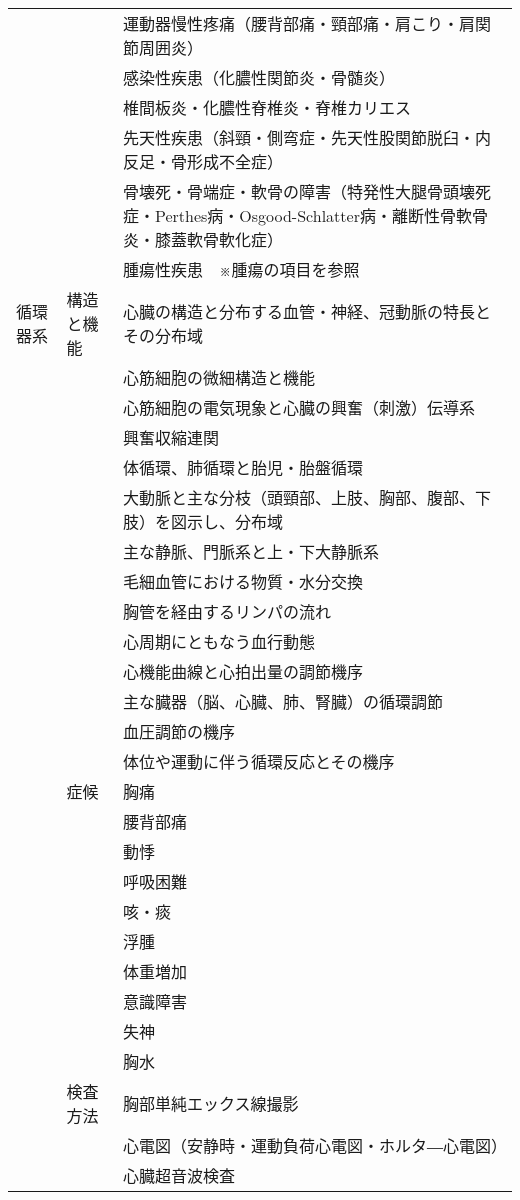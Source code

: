 \documentclass[
]{ltjsarticle}
\begin{document}
\begin{xltabular}{\linewidth}{XXX}
 &  & 運動器慢性疼痛（腰背部痛・頸部痛・肩こり・肩関節周囲炎） \\
 &  & 感染性疾患（化膿性関節炎・骨髄炎） \\
 &  & 椎間板炎・化膿性脊椎炎・脊椎カリエス \\
 &  & 先天性疾患（斜頸・側弯症・先天性股関節脱臼・内反足・骨形成不全症） \\
 &  & 骨壊死・骨端症・軟骨の障害（特発性大腿骨頭壊死症・Perthes病・Osgood-Schlatter病・離断性骨軟骨炎・膝蓋軟骨軟化症） \\
 &  & 腫瘍性疾患　※腫瘍の項目を参照 \\
循環器系 & 構造と機能 & 心臓の構造と分布する血管・神経、冠動脈の特長とその分布域 \\
 &  & 心筋細胞の微細構造と機能 \\
 &  & 心筋細胞の電気現象と心臓の興奮（刺激）伝導系 \\
 &  & 興奮収縮連関 \\
 &  & 体循環、肺循環と胎児・胎盤循環 \\
 &  & 大動脈と主な分枝（頭頸部、上肢、胸部、腹部、下肢）を図示し、分布域 \\
 &  & 主な静脈、門脈系と上・下大静脈系 \\
 &  & 毛細血管における物質・水分交換 \\
 &  & 胸管を経由するリンパの流れ \\
 &  & 心周期にともなう血行動態 \\
 &  & 心機能曲線と心拍出量の調節機序 \\
 &  & 主な臓器（脳、心臓、肺、腎臓）の循環調節 \\
 &  & 血圧調節の機序 \\
 &  & 体位や運動に伴う循環反応とその機序 \\
 & 症候 & 胸痛 \\
 &  & 腰背部痛 \\
 &  & 動悸 \\
 &  & 呼吸困難 \\
 &  & 咳・痰 \\
 &  & 浮腫 \\
 &  & 体重増加 \\
 &  & 意識障害 \\
 &  & 失神 \\
 &  & 胸水 \\
 & 検査方法 & 胸部単純エックス線撮影 \\
 &  & 心電図（安静時・運動負荷心電図・ホルタ―心電図） \\
 &  & 心臓超音波検査 \\

\end{xltabular}
\end{document}
